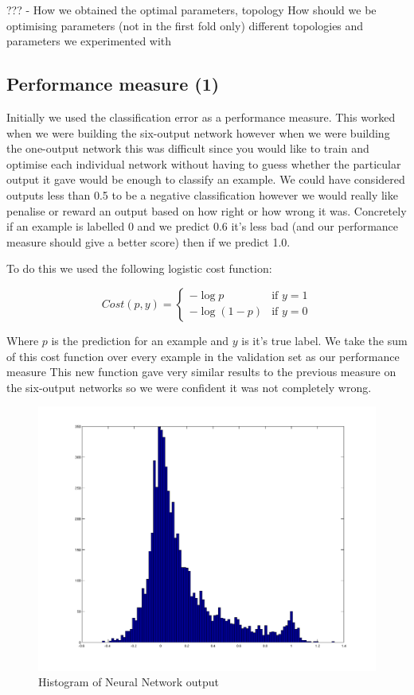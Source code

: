 \documentclass[10pt,a4paper]{article}
\begin{document}
???
- How we obtained the optimal parameters, topology
How should we be optimising parameters (not in the first fold only)
different topologies and parameters we experimented with

\subsection{Performance measure (1)}
Initially we used the classification error as a performance measure. 
This worked when we were building the six-output network however when we were building the one-output network this was difficult since you would like to train and optimise each individual network without having to guess whether the particular output it gave would be enough to classify an example.
We could have considered outputs less than 0.5 to be a negative classification however we would really like penalise or reward an output based on how right or how wrong it was.
Concretely if an example is labelled 0 and we predict 0.6 it's less bad (and our performance measure should give a better score) then if we predict 1.0. 

To do this we used the following logistic cost function:

\[
    Cost(p, y)= 
\begin{cases}
    -\log{p}& \text{if } y = 1\\
    -\log{(1 - p)}              & \text{if } y = 0
\end{cases}
\]

Where $p$ is the prediction for an example and $y$ is it's true label.
We take the sum of this cost function over every example in the validation set as our performance measure 
This new function gave very similar results to the previous measure on the six-output networks so we were confident it was not completely wrong.

\begin{figure}[!ht]
     \centering
     \includegraphics[width=\textwidth]{../../images/clean_hist.png}
     \caption{Histogram of Neural Network output}
     \label{fig:tree2}
\end{figure}
\end{document}
